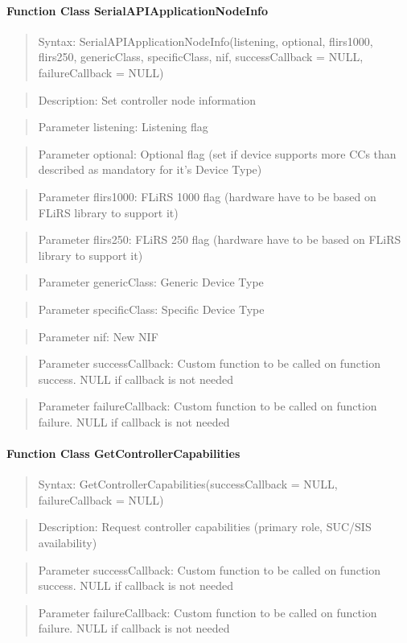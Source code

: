 \paragraph {Function Class SerialAPIApplicationNodeInfo}
\begin{quote} Syntax: SerialAPIApplicationNodeInfo(listening, optional, flirs1000, flirs250, genericClass, specificClass, nif, successCallback = NULL, failureCallback = NULL)\end{quote}
\begin{quote} Description: Set controller node information\end{quote}
\begin{quote} Parameter listening: Listening flag\end{quote}
\begin{quote} Parameter optional: Optional flag (set if device supports more CCs than described as mandatory for it's Device Type)\end{quote}
\begin{quote} Parameter flirs1000: FLiRS 1000 flag (hardware have to be based on FLiRS library to support it)\end{quote}
\begin{quote} Parameter flirs250: FLiRS 250 flag (hardware have to be based on FLiRS library to support it)\end{quote}
\begin{quote} Parameter genericClass: Generic Device Type\end{quote}
\begin{quote} Parameter specificClass: Specific Device Type\end{quote}
\begin{quote} Parameter nif: New NIF\end{quote}
\begin{quote} Parameter successCallback: Custom function to be called on function success. NULL if callback is not needed\end{quote} 
\begin{quote} Parameter failureCallback: Custom function to be called on function failure. NULL if callback is not needed\end{quote} 

\paragraph {Function Class GetControllerCapabilities}
\begin{quote} Syntax: GetControllerCapabilities(successCallback = NULL, failureCallback = NULL)\end{quote}
\begin{quote} Description: Request controller capabilities (primary role, SUC/SIS availability)\end{quote}
\begin{quote} Parameter successCallback: Custom function to be called on function success. NULL if callback is not needed\end{quote} 
\begin{quote} Parameter failureCallback: Custom function to be called on function failure. NULL if callback is not needed\end{quote} 

